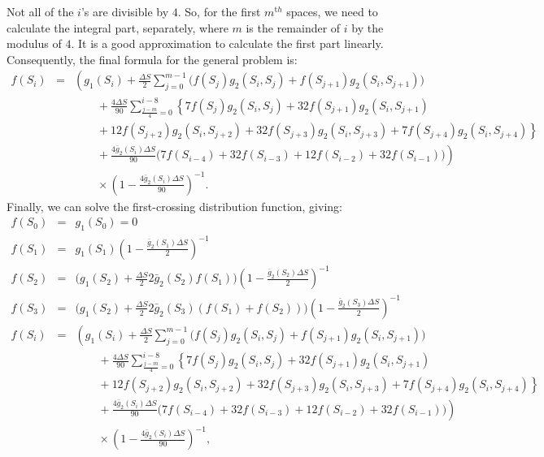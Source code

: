 Not all of the $i$'s are divisible by $4$. So, for the first $m^{\mathrm th}$ spaces, we need to calculate the integral part, separately, where $m$ is the remainder of $i$ by the modulus of $4$. It is a good approximation to calculate the first part linearly. Consequently, the final formula for the general problem is: 
\begin{eqnarray}
       f(S_i)  &=&  \left( g_1(S_i) + \frac{ \Delta S}{2}  \sum_{j=0}^{m-1}   \Big( f(S_j) g_2(S_i, S_j) + f(S_{j+1}) g_2(S_i, S_{j+1})   \Big) \right.\nonumber\\
       &&\qquad \left. {}     +  \frac{ 4 \Delta S}{90}  \sum_{\frac{j-m}{4}=0}^{i-8}   \left\{ 7 f(S_j) g_2(S_i, S_j)  + 32 f(S_{j+1}) g_2(S_i, S_{j+1})  \right.\right.\nonumber\\
       &&\qquad \left.\left. {}     + 12 f(S_{j+2}) g_2(S_i, S_{j+2})  + 32 f(S_{j+3}) g_2(S_i, S_{j+3})  + 7 f(S_{j+4}) g_2(S_i, S_{j+4})    \right\} \right. \nonumber\\ 
       &&\qquad \left. {}     + \frac{4  \bar{g}_2(S_i) \Delta S}{90} \Big( 7 f(S_{i-4}) + 32 f(S_{i-3}) + 12 f(S_{i-2}) + 32 f(S_{i-1})   \Big) \right) \nonumber\\
       &&\qquad {}     \times \left( 1 -  \frac{ 4  \bar{g}_2(S_i) \Delta S }{90}  \right)^{-1}.
\end{eqnarray}
Finally, we can solve the first-crossing distribution function, giving:
\begin{eqnarray}
       f(S_0)  &=&  g_1(S_0) = 0  \\
       f(S_1)  &=&  g_1(S_1) \left( 1 -  \frac{\bar{g}_2(S_1) \Delta S}{2}  \right)^{-1}   \\
       f(S_2)  &=&  \Big( g_1(S_2) + \frac{ \Delta S}{2} 2 \bar{g}_2(S_2) f(S_1) \Big) \left( 1 -  \frac{ \bar{g}_2(S_2) \Delta S}{2}  \right)^{-1}   \\
       f(S_3)  &=&  \Big( g_1(S_2) + \frac{ \Delta S}{2} 2 \bar{g}_2(S_3) (f(S_1) + f(S_2)) \Big) \left( 1 -  \frac{ \bar{g}_2(S_3) \Delta S}{2}  \right)^{-1}   \\
       f(S_i)  &=&  \left( g_1(S_i) + \frac{ \Delta S}{2}  \sum_{j=0}^{m-1}   \Big( f(S_j) g_2(S_i, S_j) + f(S_{j+1}) g_2(S_i, S_{j+1})   \Big) \right.\nonumber\\
       &&\qquad \left. {}     +  \frac{ 4 \Delta S}{90}  \sum_{\frac{j-m}{4}=0}^{i-8}   \left\{ 7 f(S_j) g_2(S_i, S_j) + 32 f(S_{j+1}) g_2(S_i, S_{j+1})  \right.\right.\nonumber\\
       &&\qquad \left.\left. {}     + 12 f(S_{j+2}) g_2(S_i, S_{j+2}) + 32 f(S_{j+3}) g_2(S_i, S_{j+3}) + 7 f(S_{j+4}) g_2(S_i, S_{j+4})    \right\} \right. \nonumber\\ 
       &&\qquad \left. {}     + \frac{4  \bar{g}_2(S_i) \Delta S}{90} \Big( 7 f(S_{i-4}) + 32 f(S_{i-3})+ 12 f(S_{i-2}) + 32 f(S_{i-1})  \Big) \right) \nonumber\\
       &&\qquad {}     \times \left( 1 -  \frac{ 4  \bar{g}_2(S_i) \Delta S}{90}  \right)^{-1},
\end{eqnarray}
